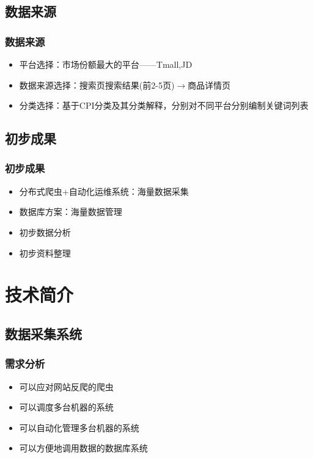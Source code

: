 \documentclass{beamer}
\begin{document}
\subsection{数据来源}
\begin{frame}
\frametitle{数据来源}
\begin{itemize}
  \item 平台选择：市场份额最大的平台——Tmall,JD
  \item 数据来源选择：搜索页搜索结果(前2-5页)$\to$商品详情页
  \item 分类选择：基于CPI分类及其分类解释，分别对不同平台分别编制关键词列表
\end{itemize}
\end{frame}

\subsection{初步成果}
\begin{frame}
\frametitle{初步成果}
\begin{itemize}
  \item 分布式爬虫+自动化运维系统：海量数据采集\footnotemark
  \item 数据库方案：海量数据管理\footnotemark
  \item 初步数据分析\footnotemark
  \item 初步资料整理\footnotemark
\end{itemize}
\end{frame}


\section{技术简介}
\subsection{数据采集系统}
\begin{frame}
\frametitle{需求分析}
\begin{itemize}
  \item 可以应对网站反爬的爬虫
  \item 可以调度多台机器的系统
  \item 可以自动化管理多台机器的系统
  \item 可以方便地调用数据的数据库系统
\end{itemize}
\end{frame}
\end{document}
